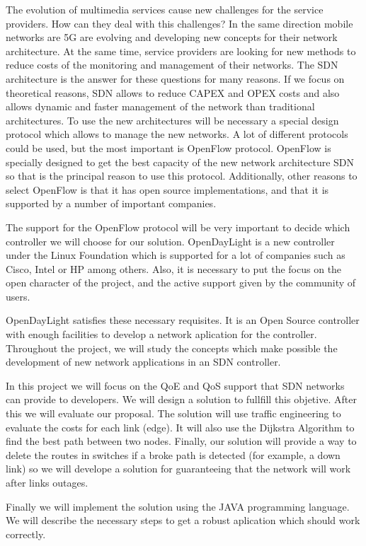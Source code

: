 The evolution of multimedia services cause new challenges for the service providers. How can they deal with this challenges? In the same direction mobile networks are 5G are evolving and developing new concepts for their network architecture.
At the same time, service providers are looking for new methods to reduce costs of the monitoring and management of their networks.
The SDN architecture is the answer for these questions for many reasons. If we focus on theoretical reasons, SDN allows to reduce \ac{CAPEX} and \ac{OPEX} costs and also allows dynamic and faster management of the network than traditional architectures.
To use the new architectures will be necessary a special design protocol which allows to manage the new networks. A lot of different protocols could be used, but the most important is OpenFlow protocol. OpenFlow is specially designed to get the best capacity of the new network architecture SDN so that is the principal reason to use this protocol. Additionally, other reasons to select OpenFlow is that it has open source implementations, and that it is supported by a number of important companies.

The support for the OpenFlow protocol will be very important to decide which controller we will choose for our solution. OpenDayLight is a new controller under the Linux Foundation which is supported for a lot of companies such as Cisco, Intel or HP among others. Also, it is necessary to put the focus on the open character of the project, and the active support given by the community of users.

OpenDayLight satisfies these necessary requisites. It is an Open Source controller with  enough facilities to develop a network aplication for the controller. Throughout the project, we will study the concepts which make possible the development of new network applications in an SDN controller.

In this project we will focus on the \ac{QoE} and \ac{QoS} support that SDN networks can provide to developers. We will design a solution to fullfill this objetive. After this we will evaluate our proposal. The solution will use traffic engineering to evaluate the costs for each link (edge). It will  also use the Dijkstra Algorithm to find the best path between two nodes. Finally, our solution will provide a way to delete the routes in switches if a broke path is detected  (for example, a down link) so we will develope a solution for guaranteeing that the network will work after links outages.

Finally we will implement the solution using the JAVA programming language. We will describe the necessary steps to get a robust aplication which should work correctly.


